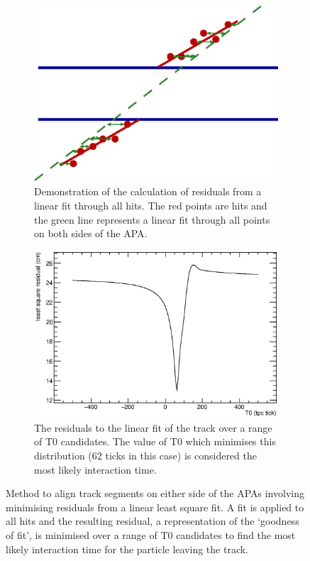 \begin{figure}
  \centering
  \begin{subfigure}[t]{0.48\linewidth}
    \centering
    \includegraphics[width=\textwidth]{track_residual.eps}
    \caption{Demonstration of the calculation of residuals from a linear fit through all hits.  The red points are hits and the green line represents a linear fit through all points on both sides of the APA.}
    \label{fig:APACrossingAligmentLeastSqResidual}
  \end{subfigure}
  \hfill
  \begin{subfigure}[t]{0.48\linewidth}
    \centering
    \includegraphics[width=\textwidth]{chisquare.eps}
    \caption{The residuals to the linear fit of the track over a range of T0 candidates.  The value of T0 which minimises this distribution (62 ticks in this case) is considered the most likely interaction time.}
    \label{fig:APACrossingAlignmentLeastSqMin}
  \end{subfigure}
  \caption[Method to align track segments on either side of the APAs involving minimising residuals from linear least square fit.]{Method to align track segments on either side of the APAs involving minimising residuals from a linear least square fit.  A fit is applied to all hits and the resulting residual, a representation of the `goodness of fit', is minimised over a range of T0 candidates to find the most likely interaction time for the particle leaving the track.}
  \label{fig:APACrossingAlignmentLeastSq}


\end{figure}

